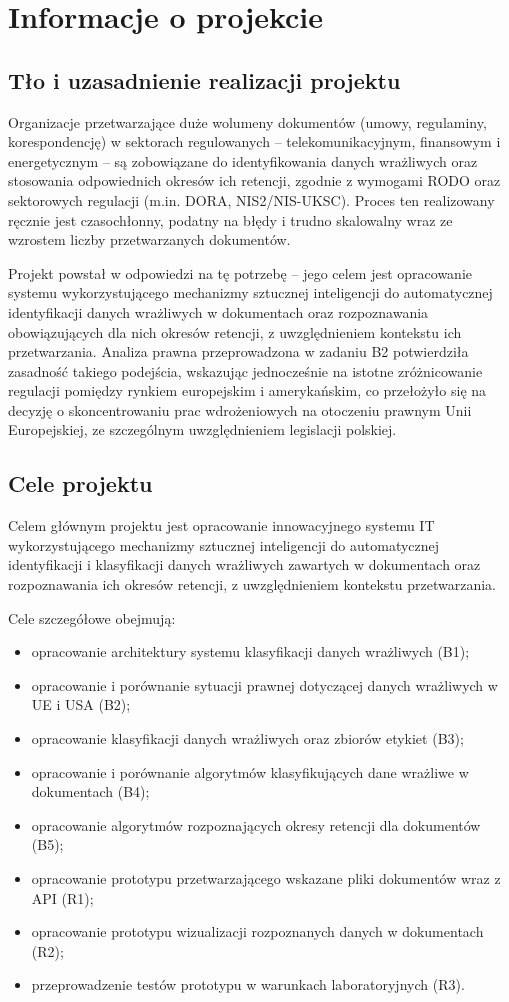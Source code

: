\documentclass[12pt,a4paper]{report}
\begin{document}
\chapter{Informacje o projekcie}
\section{Tło i uzasadnienie realizacji projektu}
Organizacje przetwarzające duże wolumeny dokumentów (umowy, regulaminy, korespondencję) w sektorach regulowanych -- telekomunikacyjnym, finansowym i energetycznym -- są zobowiązane do identyfikowania danych wrażliwych oraz stosowania odpowiednich okresów ich retencji, zgodnie z wymogami RODO oraz sektorowych regulacji (m.in. DORA, NIS2/NIS-UKSC). Proces ten realizowany ręcznie jest czasochłonny, podatny na błędy i trudno skalowalny wraz ze wzrostem liczby przetwarzanych dokumentów.

Projekt powstał w odpowiedzi na tę potrzebę -- jego celem jest opracowanie systemu wykorzystującego mechanizmy sztucznej inteligencji do automatycznej identyfikacji danych wrażliwych w dokumentach oraz rozpoznawania obowiązujących dla nich okresów retencji, z uwzględnieniem kontekstu ich przetwarzania. Analiza prawna przeprowadzona w zadaniu B2 potwierdziła zasadność takiego podejścia, wskazując jednocześnie na istotne zróżnicowanie regulacji pomiędzy rynkiem europejskim i amerykańskim, co przełożyło się na decyzję o skoncentrowaniu prac wdrożeniowych na otoczeniu prawnym Unii Europejskiej, ze szczególnym uwzględnieniem legislacji polskiej.

\section{Cele projektu}
Celem głównym projektu jest opracowanie innowacyjnego systemu IT wykorzystującego mechanizmy sztucznej inteligencji do automatycznej identyfikacji i klasyfikacji danych wrażliwych zawartych w dokumentach oraz rozpoznawania ich okresów retencji, z uwzględnieniem kontekstu przetwarzania.

Cele szczegółowe obejmują:
\begin{itemize}
    \item opracowanie architektury systemu klasyfikacji danych wrażliwych (B1);
    \item opracowanie i porównanie sytuacji prawnej dotyczącej danych wrażliwych w UE i USA (B2);
    \item opracowanie klasyfikacji danych wrażliwych oraz zbiorów etykiet (B3);
    \item opracowanie i porównanie algorytmów klasyfikujących dane wrażliwe w dokumentach (B4);
    \item opracowanie algorytmów rozpoznających okresy retencji dla dokumentów (B5);
    \item opracowanie prototypu przetwarzającego wskazane pliki dokumentów wraz z API (R1);
    \item opracowanie prototypu wizualizacji rozpoznanych danych w dokumentach (R2);
    \item przeprowadzenie testów prototypu w warunkach laboratoryjnych (R3).
\end{itemize}
\end{document}
